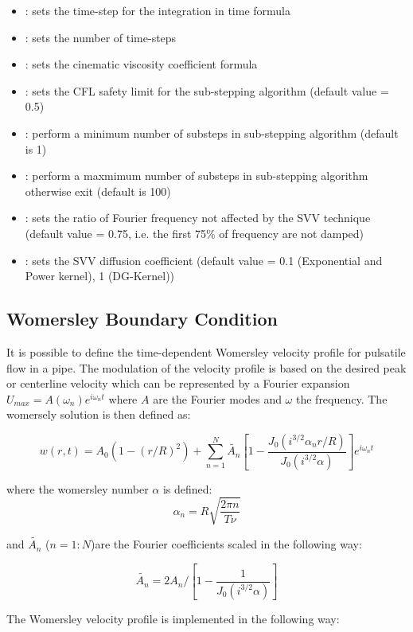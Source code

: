 \begin{itemize}
\item {}: sets the time-step for the integration in time formula
\item {}: sets the number of time-steps
\item {}: sets the cinematic viscosity coefficient formula
\item {}: sets the CFL safety limit for the sub-stepping algorithm (default value = 0.5)
\item {}: perform a minimum number of substeps in sub-stepping algorithm (default is 1)
\item {}: perform a maxmimum  number of substeps in sub-stepping algorithm otherwise exit (default is 100)
\item {}: sets the ratio of Fourier frequency not affected by the SVV technique (default value = 0.75, i.e. the first 75\% of frequency are not damped)
\item {}: sets the SVV diffusion coefficient (default value = 0.1 (Exponential and Power kernel), 1 (DG-Kernel))
\end{itemize}

\subsection{Womersley Boundary Condition}

It is possible to define the time-dependent Womersley velocity profile
for pulsatile flow in a pipe. The modulation of the velocity profile
is based on the desired peak or centerline velocity which can be
represented by a Fourier expansion $U_{max}=A(\omega_n)e^{i\omega_n
  t}$ where $A$ are the Fourier modes and $\omega $ the frequency. The
womersely solution is then defined as:

$$ w(r,t) = A_0(1-(r/R)^2) + \sum_{n=1}^N
\tilde{A_n}[1-\frac{J_0(i^{3/2}\alpha_n r/R)}{J_0(i^{3/2}
    \alpha)}]e^{i\omega_n t} $$

where the womersley number $\alpha$ is defined:
$$ \alpha_n = R\sqrt{\frac{2\pi n}{T\nu}}$$

and $\tilde{A_n}$ ($n=1:N$)are the Fourier coefficients scaled in the
following way:

$$ \tilde{A_n} = 2A_n/[1 - \frac{1}{J_0(i^{3/2}\alpha)}] $$

The Womersley velocity profile is implemented in the following way:

